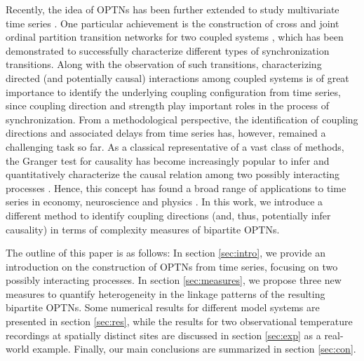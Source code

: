 \documentclass[12pt,aip,cha,reprint,nofootinbib]{revtex4-1}
\begin{document}
Recently, the idea of OPTNs has been further extended to study multivariate time series \cite{zhangSciRep2017}. One particular achievement is the construction of cross and joint ordinal partition transition networks for two coupled systems \cite{Guo2018}, which has been demonstrated to successfully characterize different types of synchronization transitions. Along with the observation of such transitions, characterizing directed (and potentially causal) interactions among coupled systems is of great importance to identify the underlying coupling configuration from time series, since coupling direction and strength play important roles in the process of synchronization. From a methodological perspective, the identification of coupling directions and associated delays \cite{Coufal2017} from time series has, however, remained a challenging task so far. As a classical representative of a vast class of methods, the Granger test for causality has become increasingly popular to infer and quantitatively characterize the causal relation among two possibly interacting processes \cite{Granger1969}. Hence, this concept has found a broad range of applications to time series in economy, neuroscience and physics \cite{Ding_Book_2007,Dhamala_prl2008}. In this work, we introduce a different method to identify coupling directions (and, thus, potentially infer causality) in terms of complexity measures of bipartite OPTNs. 

The outline of this paper is as follows: In section \ref{sec:intro}, we provide an introduction on the construction of OPTNs from time series, focusing on two possibly interacting processes. In section \ref{sec:measures}, we propose three new measures to quantify heterogeneity in the linkage patterns of the resulting bipartite OPTNs. Some numerical results for different model systems are presented in section \ref{sec:res}, while the results for two observational temperature recordings at spatially distinct sites are discussed in section \ref{sec:exp} as a real-world example. Finally, our main conclusions are summarized in section \ref{sec:con}. 
\end{document}
